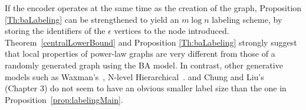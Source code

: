 If the encoder operates at the same time as the creation of the graph, Proposition \ref{Th:baLabeling} can be strengthened to yield  an $m \log n$ labeling scheme, by   storing the  identifiers of the $\epsilon$ vertices to the node introduced.
Theorem~\ref{centralLowerBound} and Proposition \ref{Th:baLabeling} strongly suggest that local properties of  power-law graphs  are very different from those  of  a randomly generated graph using the BA model.
  In contrast, other generative models such as   Waxman's~\cite{waxman1988routing}, N-level Hierarchical~\cite{calvert1997modeling}.
and Chung and Liu's~\cite{chung2006complex} (Chapter 3)  do not seem to have an obvious smaller label size than the one in Proposition~\ref{prop:labelingMain}.
